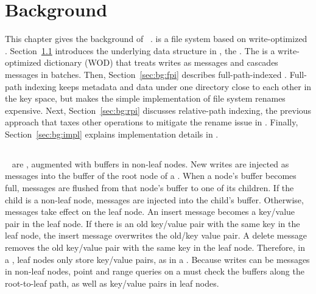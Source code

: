 \chapter{Background}
\label{chap:bg}

This chapter gives the background of \betrfs~\citep{betrfs1,betrfs1tos,betrfs2,betrfs2tos,betrfs3}.
\betrfs is a file system based on write-optimized \bets.
Section~\ref{sec:bg:bet} introduces the underlying data structure in \betrfs,
the \bet.
The \bet is a write-optimized dictionary (WOD)
that treats writes as messages and cascades messages in batches.
Then, Section~\ref{sec:bg:fpi} describes full-path-indexed \betrfs.
Full-path indexing keeps metadata and data under one directory close to each
other in the key space,
but makes the simple implementation of file system renames expensive.
Next, Section~\ref{sec:bg:rpi} discusses relative-path indexing,
the previous approach that taxes other operations to mitigate the rename issue
in \betrfs.
Finally, Section~\ref{sec:bg:impl} explains implementation details
in \betrfs.

\section{\bets}
\label{sec:bg:bet}

\bets~\citep{bet,betlogin} are \btrees, augmented with buffers in non-leaf
nodes.
New writes are injected as messages into the buffer of the root node of a \bet.
When a node's buffer becomes full, messages are flushed from that node's buffer
to one of its children.
If the child is a non-leaf node, messages are injected into the child's
buffer.
Otherwise, messages take effect on the leaf node.
An insert message becomes a key/value pair in the leaf node.
If there is an old key/value pair with the same key in the leaf node,
the insert message overwrites the old/key value pair.
A delete message removes the old key/value pair with the same key in the leaf
node.
Therefore, in a \bet, leaf nodes only store key/value pairs, as in a \btree.
Because writes can be messages in non-leaf nodes, point and range queries on a
\bet must check the buffers along the root-to-leaf path,
as well as key/value pairs in leaf nodes.

